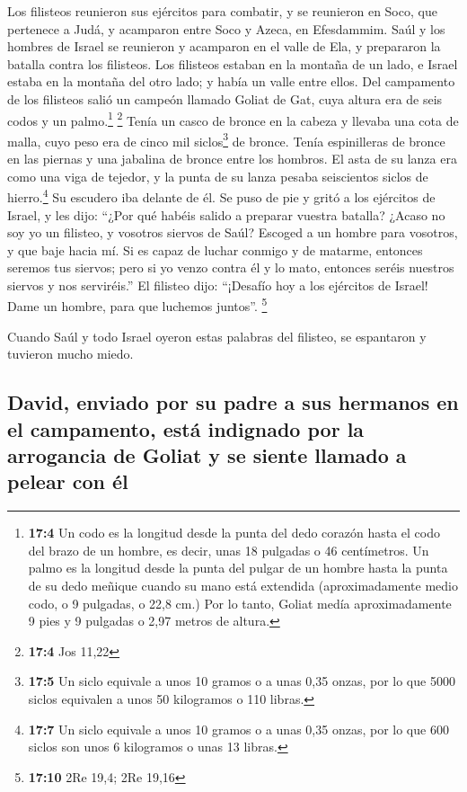  Los filisteos reunieron sus ejércitos para combatir, y se
reunieron en Soco, que pertenece a Judá, y acamparon entre Soco y Azeca,
en Efesdammim.  Saúl y los hombres de Israel se reunieron
y acamparon en el valle de Ela, y prepararon la batalla contra los
filisteos.  Los filisteos estaban en la montaña de un
lado, e Israel estaba en la montaña del otro lado; y había un valle
entre ellos.  Del campamento de los filisteos salió un
campeón llamado Goliat de Gat, cuya altura era de seis codos y un
palmo.\footnote{\textbf{17:4} Un codo es la longitud desde la punta del
  dedo corazón hasta el codo del brazo de un hombre, es decir, unas 18
  pulgadas o 46 centímetros. Un palmo es la longitud desde la punta del
  pulgar de un hombre hasta la punta de su dedo meñique cuando su mano
  está extendida (aproximadamente medio codo, o 9 pulgadas, o 22,8 cm.)
  Por lo tanto, Goliat medía aproximadamente 9 pies y 9 pulgadas o 2,97
  metros de altura.} \footnote{\textbf{17:4} Jos 11,22} 
Tenía un casco de bronce en la cabeza y llevaba una cota de malla, cuyo
peso era de cinco mil siclos\footnote{\textbf{17:5} Un siclo equivale a
  unos 10 gramos o a unas 0,35 onzas, por lo que 5000 siclos equivalen a
  unos 50 kilogramos o 110 libras.} de bronce.  Tenía
espinilleras de bronce en las piernas y una jabalina de bronce entre los
hombros.  El asta de su lanza era como una viga de
tejedor, y la punta de su lanza pesaba seiscientos siclos de
hierro.\footnote{\textbf{17:7} Un siclo equivale a unos 10 gramos o a
  unas 0,35 onzas, por lo que 600 siclos son unos 6 kilogramos o unas 13
  libras.} Su escudero iba delante de él.  Se puso de pie
y gritó a los ejércitos de Israel, y les dijo: ``¿Por qué habéis salido
a preparar vuestra batalla? ¿Acaso no soy yo un filisteo, y vosotros
siervos de Saúl? Escoged a un hombre para vosotros, y que baje hacia mí.
 Si es capaz de luchar conmigo y de matarme, entonces
seremos tus siervos; pero si yo venzo contra él y lo mato, entonces
seréis nuestros siervos y nos serviréis.''  El filisteo
dijo: ``¡Desafío hoy a los ejércitos de Israel! Dame un hombre, para que
luchemos juntos''. \footnote{\textbf{17:10} 2Re 19,4; 2Re 19,16}

 Cuando Saúl y todo Israel oyeron estas palabras del
filisteo, se espantaron y tuvieron mucho miedo.

\hypertarget{david-enviado-por-su-padre-a-sus-hermanos-en-el-campamento-estuxe1-indignado-por-la-arrogancia-de-goliat-y-se-siente-llamado-a-pelear-con-uxe9l}{%
\subsection{David, enviado por su padre a sus hermanos en el campamento,
está indignado por la arrogancia de Goliat y se siente llamado a pelear
con
él}\label{david-enviado-por-su-padre-a-sus-hermanos-en-el-campamento-estuxe1-indignado-por-la-arrogancia-de-goliat-y-se-siente-llamado-a-pelear-con-uxe9l}}

